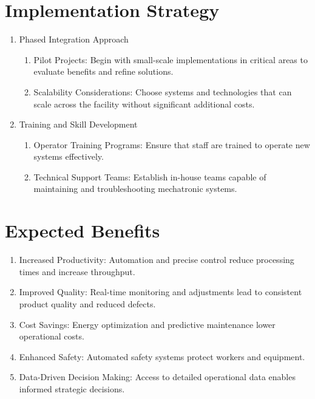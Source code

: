 \section{Implementation Strategy}
\begin{enumerate}
    \item Phased Integration Approach
    \begin{enumerate}
        \item Pilot Projects: Begin with small-scale implementations in critical areas to evaluate benefits and refine solutions.
        \item Scalability Considerations: Choose systems and technologies that can scale across the facility without significant additional costs.
    \end{enumerate}
    \item Training and Skill Development
    \begin{enumerate}
        \item Operator Training Programs: Ensure that staff are trained to operate new systems effectively.
        \item Technical Support Teams: Establish in-house teams capable of maintaining and troubleshooting mechatronic systems.
    \end{enumerate}
\end{enumerate}

\section{Expected Benefits}
\begin{enumerate}
    \item Increased Productivity: Automation and precise control reduce processing times and increase throughput.
    \item Improved Quality: Real-time monitoring and adjustments lead to consistent product quality and reduced defects.
    \item Cost Savings: Energy optimization and predictive maintenance lower operational costs.
    \item Enhanced Safety: Automated safety systems protect workers and equipment.
    \item Data-Driven Decision Making: Access to detailed operational data enables informed strategic decisions.
\end{enumerate}
